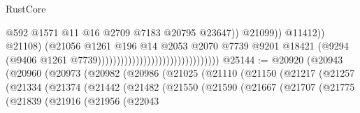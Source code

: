 \begin{lexlean}{RustCore}
\begin{coremodule}
                                                                            @592
                                                                            @1571
                                                                            @11
                                                                            @16
                                                                            @2709
                                                                            @7183
                                                                            @20795
                                                                            @23647))
                                                                        @21099))
                                                                    @11412))
                                                                @21108)
                                                              (@21056
                                                                @1261
                                                                @196
                                                                @14
                                                                @2053
                                                                @2070
                                                                @7739
                                                                @9201
                                                                @18421
                                                                (@9294
                                                                  (@9406
                                                                    @1261
                                                                    @7739))))))))))))))))))))))))))))))))
@25144 := @20920
    (@20943
      (@20960
        (@20973
          (@20982
            (@20986
              (@21025
                (@21110
                  (@21150
                    (@21217
                      (@21257
                        (@21334
                          (@21374
                            (@21442
                              (@21482
                                (@21550
                                  (@21590
                                    (@21667
                                      (@21707
                                        (@21775
                                          (@21839
                                            (@21916
                                              (@21956
                                                (@22043

\end{coremodule}
\end{lexlean}
